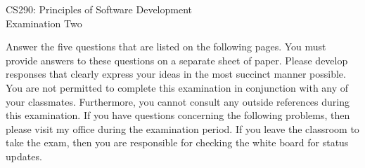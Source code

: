 \documentclass[12pt,epsf,psfig,graphics]{article}
\def\widow#1{\vskip #1\vbadness10000\penalty-200\vskip-#1}
\begin{document}
\def\widow#1{\vskip #1\vbadness10000\penalty-200\vskip-#1}

\begin{center}

CS290: Principles of Software Development \\
Examination Two \\

\end{center}

\noindent Answer the five questions that are listed on the following pages.  You must provide answers to these questions
on a separate sheet of paper.  Please develop responses that clearly express your ideas in the most succinct manner
possible.  You are not permitted to complete this examination in conjunction with any of your classmates.  Furthermore,
you cannot consult any outside references during this examination.  If you have questions concerning the following
problems, then please visit my office during the examination period.  If you leave the classroom to take the exam, then
you are responsible for checking the white board for status updates.
\end{document}
